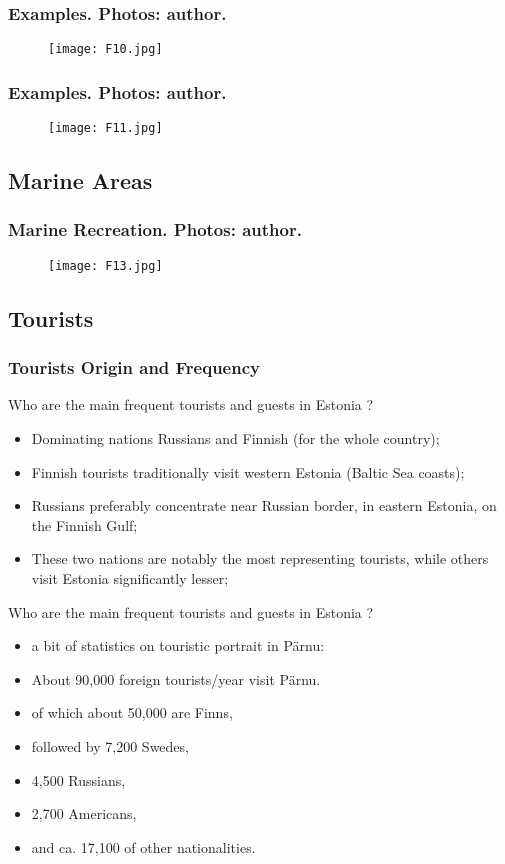 \documentclass[pdflatex,compress,8pt,
	xcolor={dvipsnames,dvipsnames,svgnames,x11names,table},
]{beamer}
\begin{document}
\begin{frame}\frametitle{Examples. Photos: author.}
\begin{figure}[H]
	\centering
		\texttt{[image: F10.jpg]}
\end{figure}
\end{frame}

\begin{frame}\frametitle{Examples. Photos: author.}
\begin{figure}[H]
	\centering
		\texttt{[image: F11.jpg]}
\end{figure}
\end{frame}

\subsection{Marine Areas}
\begin{frame}\frametitle{Marine Recreation. Photos: author.}
\begin{figure}[H]
	\centering
		\texttt{[image: F13.jpg]}
\end{figure}
\end{frame}
 
\subsection{Tourists}
\begin{frame}\frametitle{Tourists Origin and Frequency}
Who are the main frequent tourists and guests in Estonia ?
\begin{itemize}
	\item Dominating nations Russians and Finnish (for the whole country);
	\item Finnish tourists traditionally visit western Estonia (Baltic Sea coasts);
	\item Russians preferably concentrate near Russian border, in eastern Estonia, on the Finnish Gulf;
	\item These two nations are notably the most representing tourists, while others visit Estonia significantly lesser;
\end{itemize}
Who are the main frequent tourists and guests in Estonia ?
\begin{itemize}
	\item a bit of statistics on touristic portrait in Pärnu:
	\item About 90,000 foreign tourists/year visit Pärnu. 
	\item of which about 50,000 are Finns,
	\item followed by 7,200 Swedes,
	\item 4,500 Russians,
	\item 2,700 Americans,
	\item and ca. 17,100 of other nationalities.
\end{itemize}
\end{frame}
\end{document}
